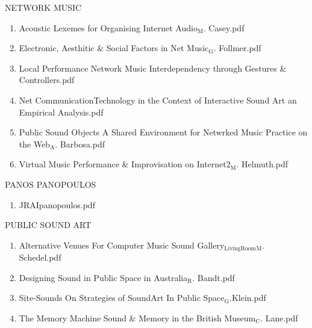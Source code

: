 \documentclass[11pt]{article}
\begin{document}
\item NETWORK MUSIC
\label{sec-1-1-1-1-49-1-25}
\begin{enumerate}
\item Acoustic Lexemes for Organising Internet Audio$_{\text{M}}$. Casey.pdf
\label{sec-1-1-1-1-49-1-25-1}

\item Electronic, Aesthitic \& Social Factors in Net Music$_{\text{G}}$. Follmer.pdf
\label{sec-1-1-1-1-49-1-25-2}

\item Local Performance Network Music Interdependency through Gestures \& Controllers.pdf
\label{sec-1-1-1-1-49-1-25-3}

\item Net CommunicationTechnology in the Context of Interactive Sound Art an Empirical Analysis.pdf
\label{sec-1-1-1-1-49-1-25-4}

\item Public Sound Objects A Shared Environment for Netwrked Music Practice on the Web$_{\text{A}}$. Barbosa.pdf
\label{sec-1-1-1-1-49-1-25-5}

\item Virtual Music Performance \& Improvisation on Internet2$_{\text{M}}$. Helmuth.pdf
\label{sec-1-1-1-1-49-1-25-6}
\end{enumerate}

\item PANOS PANOPOULOS
\label{sec-1-1-1-1-49-1-26}
\begin{enumerate}
\item JRAIpanopoulos.pdf
\label{sec-1-1-1-1-49-1-26-1}
\end{enumerate}

\item PUBLIC SOUND ART
\label{sec-1-1-1-1-49-1-27}
\begin{enumerate}
\item Alternative Venues For Computer Music Sound Gallery$_{\text{LivingRoom}}$$_{\text{M}}$. Schedel.pdf
\label{sec-1-1-1-1-49-1-27-1}

\item Designing Sound in Public Space in Australia$_{\text{R}}$. Bandt.pdf
\label{sec-1-1-1-1-49-1-27-2}

\item Site-Sounds On Strategies of SoundArt In Public Space$_{\text{G}}$.Klein.pdf
\label{sec-1-1-1-1-49-1-27-3}

\item The Memory Machine Sound \& Memory in the British Museum$_{\text{C}}$. Lane.pdf
\label{sec-1-1-1-1-49-1-27-4}
\end{enumerate}
\end{document}
